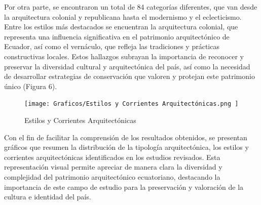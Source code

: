 \documentclass[journal,article,submit,pdftex,moreauthors]{Definitions/mdpi}
\begin{document}
\par %
Por otra parte, se encontraron un total de 84 categorías diferentes, que van desde la arquitectura colonial y republicana hasta el modernismo y el eclecticismo. Entre los estilos más destacados se encuentran la arquitectura colonial, que representa una influencia significativa en el patrimonio arquitectónico de Ecuador, así como el vernáculo, que refleja las tradiciones y prácticas constructivas locales. Estos hallazgos subrayan la importancia de reconocer y preservar la diversidad cultural y arquitectónica del país, así como la necesidad de desarrollar estrategias de conservación que valoren y protejan este patrimonio único (Figura 6).
 \par %
  \begin{figure} [h!]
    \centering
    \texttt{[image: Graficos/Estilos y Corrientes Arquitectónicas.png ]}
    \caption{Estilos y Corrientes Arquitectónicas}
    \label{fig:grafico}
\end{figure}
\par %
 
Con el fin de facilitar la comprensión de los resultados obtenidos, se presentan gráficos que resumen la distribución de la tipología arquitectónica, los estilos y corrientes arquitectónicas identificados en los estudios revisados. Esta representación visual permite apreciar de manera clara la diversidad y complejidad del patrimonio arquitectónico ecuatoriano, destacando la importancia de este campo de estudio para la preservación y valoración de la cultura e identidad del país.\par %
 
\end{document}
